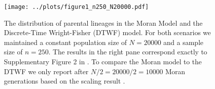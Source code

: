 \documentclass[10.5pt]{article}
\begin{document}
\begin{figure}
	\begin{center}
	\captionsetup{width=0.75\textwidth}
	\texttt{[image: ../plots/figure1\_n250\_N20000.pdf]}
	\caption{The distribution of parental lineages in the Moran Model and the Discrete-Time Wright-Fisher (DTWF) model. For both scenarios we maintained a constant population size of $N = 20000$ and a sample size of $n=250$. The results in the right pane correspond exactly to Supplementary Figure 2 in \citet{Bhaskar2014}. To compare the Moran model to the DTWF we only report after $N/2 = 20000/2 = 10000$ Moran generations based on the scaling result \citep{Wakeley2008}.}
	\end{center}
\end{figure}\label{fig:1}




\end{document}
